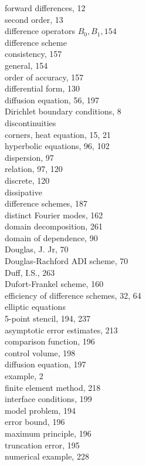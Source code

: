 \documentclass[10pt]{article}
\begin{document}
forward differences, 12\\
second order, 13\\
difference operators \(B_{0}, B_{1}, 154\)\\
difference scheme\\
consistency, 157\\
general, 154\\
order of accuracy, 157\\
differential form, 130\\
diffusion equation, 56, 197\\
Dirichlet boundary conditions, 8\\
discontinuities\\
corners, heat equation, 15, 21\\
hyperbolic equations, 96, 102\\
dispersion, 97\\
relation, 97, 120\\
discrete, 120\\
dissipative\\
difference schemes, 187\\
distinct Fourier modes, 162\\
domain decomposition, 261\\
domain of dependence, 90\\
Douglas, J. Jr, 70\\
Douglas-Rachford ADI scheme, 70\\
Duff, I.S., 263\\
Dufort-Frankel scheme, 160\\
efficiency of difference schemes, 32, 64\\
elliptic equations\\
5-point stencil, 194, 237\\
asymptotic error estimates, 213\\
comparison function, 196\\
control volume, 198\\
diffusion equation, 197\\
example, 2\\
finite element method, 218\\
interface conditions, 199\\
model problem, 194\\
error bound, 196\\
maximum principle, 196\\
truncation error, 195\\
numerical example, 228\\
\end{document}
